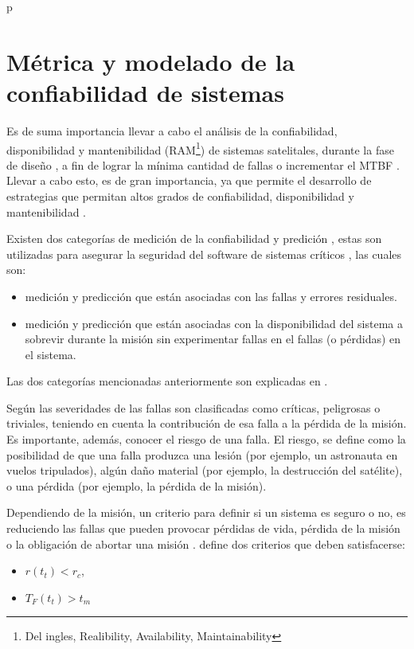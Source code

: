 p\section{Métrica y modelado de la confiabilidad de sistemas}
Es de suma importancia llevar a cabo el análisis de la confiabilidad, disponibilidad y mantenibilidad (RAM\footnote{Del ingles, Realibility, Availability, Maintainability}) de sistemas satelitales, durante la fase de diseño \citep{Hoque15}, a fin de lograr la mínima cantidad de fallas o incrementar el \ac{MTBF} \citep{Peng13} . Llevar a cabo esto, es de gran importancia, ya que permite el desarrollo de estrategias que permitan altos grados de confiabilidad, disponibilidad y mantenibilidad \citep{Hoque15}.

Existen dos categorías de medición de la confiabilidad y predición \citep{Schneidewind97}, estas son utilizadas para asegurar la seguridad del software de sistemas críticos \citep{Schneidewind97}, las cuales son:
  \begin{itemize}
    \item medición y predicción que están asociadas con las fallas y errores residuales.
    \item medición y predicción que están asociadas con la disponibilidad del sistema a sobrevir durante la misión sin experimentar fallas en el fallas (o pérdidas) en el sistema.
  \end{itemize}

  Las dos categorías mencionadas anteriormente son explicadas en \cite{Schneidewind97}.

  Según \cite{Liu14} las severidades de las fallas son clasificadas como críticas, peligrosas o triviales, teniendo en cuenta la contribución de esa falla a la pérdida de la misión. Es importante, además, conocer el riesgo de una falla. El riesgo, se define como la posibilidad de que una falla produzca una lesión (por ejemplo, un astronauta en vuelos tripulados), algún daño material (por ejemplo, la destrucción del satélite), o una pérdida (por ejemplo, la pérdida de la misión).

  Dependiendo de la misión, un criterio para definir si un sistema es seguro o no, es reduciendo las fallas que pueden provocar pérdidas de vida, pérdida de la misión o la obligación de abortar una misión \citep{Schneidewind97}. \cite{Schneidewind97} define dos criterios que deben satisfacerse:
  \begin{itemize}
    \item $r(t_t) < r_c$,
    \item $T_F(t_t) > t_m$
  \end{itemize}

